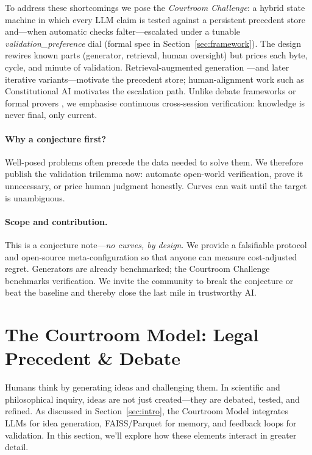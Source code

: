 \documentclass[11pt]{article}
\begin{document}
To address these shortcomings we pose the \textit{Courtroom Challenge}: a
hybrid state machine in which every LLM claim is tested against a persistent
precedent store and—when automatic checks falter—escalated under a
tunable \textit{validation\_preference} dial (formal spec in
Section~\ref{sec:framework}).  The design rewires known parts
(generator, retrieval, human oversight) but prices each byte, cycle,
and minute of validation.  Retrieval-augmented generation \citep{lewis2020rag,
fan2024ragsurvey}—and later iterative variants—motivate the precedent
store; human-alignment work such as Constitutional AI
\citep{bai2022constitutional} motivates the escalation path.
Unlike debate frameworks \citep{chen2024reconcile,madaan2023selfrefine} or formal
provers \citep{wang2025malot}, we emphasise continuous cross-session
verification: knowledge is never final, only current.

\paragraph{Why a conjecture first?}
Well-posed problems often precede the data needed to solve them.  We
therefore publish the validation trilemma now: automate open-world
verification, prove it unnecessary, or price human judgment honestly.
Curves can wait until the target is unambiguous.

\paragraph{Scope and contribution.}
This is a conjecture note—\emph{no curves, by design}.  We provide a
falsifiable protocol and open-source meta-configuration so that anyone can
measure cost-adjusted regret.  Generators are already benchmarked; the
Courtroom Challenge benchmarks verification.  We invite the community
to break the conjecture or beat the baseline and thereby close the last
mile in trustworthy AI.

\section{The Courtroom Model: Legal Precedent \& Debate}
\label{sec:courtroom}
Humans think by generating ideas and challenging them. In scientific and philosophical inquiry, ideas are not just created—they are debated, tested, and refined. As discussed in Section~\ref{sec:intro}, the Courtroom Model integrates LLMs for idea generation, FAISS/Parquet for memory, and feedback loops for validation. In this section, we'll explore how these elements interact in greater detail.
\end{document}
